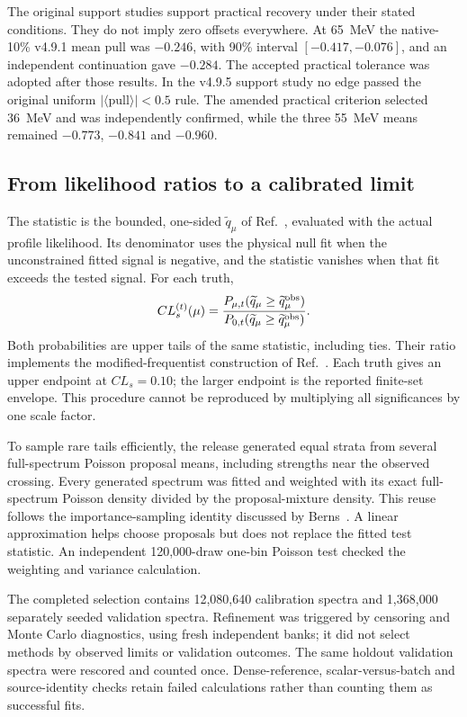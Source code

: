 The original support studies support practical recovery under their stated
conditions. They do not imply zero offsets everywhere. At 65~MeV the
native-10\% v4.9.1 mean pull was $-0.246$, with 90\% interval
$[-0.417,-0.076]$, and an independent continuation gave $-0.284$.
The accepted practical tolerance was adopted after those results. In the
v4.9.5 support study no edge passed the original uniform
$|\langle\mathrm{pull}\rangle|<0.5$ rule. The amended practical criterion
selected 36~MeV and was independently confirmed, while the three
55~MeV means remained $-0.773$, $-0.841$ and $-0.960$.

\subsection{From likelihood ratios to a calibrated limit}
The statistic is the bounded, one-sided $\widetilde q_\mu$ of
Ref.~\cite{Cowan2011}, evaluated with the actual profile likelihood.
Its denominator uses the physical null fit when the unconstrained fitted
signal is negative, and the statistic vanishes when that fit exceeds the
tested signal. For each truth,
\begin{equation}
 CL_s^{(t)}(\mu)=
 \frac{P_{\mu,t}(\widetilde q_\mu\geq\widetilde q_\mu^{\rm obs})}
      {P_{0,t}(\widetilde q_\mu\geq\widetilde q_\mu^{\rm obs})}.
 \label{v5-eq:empirical-cls}
\end{equation}
Both probabilities are upper tails of the same statistic, including ties.
Their ratio implements the modified-frequentist construction
of Ref.~\cite{Read2002}. Each truth gives an upper endpoint at
$CL_s=0.10$; the larger endpoint is the reported finite-set envelope.
This procedure cannot be reproduced by multiplying all significances by
one scale factor.

To sample rare tails efficiently, the release generated equal strata
from several full-spectrum Poisson proposal means, including strengths
near the observed crossing. Every generated spectrum was fitted and
weighted with its exact full-spectrum Poisson density divided by the
proposal-mixture density. This reuse follows the importance-sampling
identity discussed by Berns~\cite{Berns2024}. A linear approximation
helps choose proposals but does not replace the fitted test statistic.
An independent 120,000-draw one-bin Poisson test checked the weighting
and variance calculation.

The completed selection contains 12,080,640 calibration spectra and
1,368,000 separately seeded validation spectra. Refinement was triggered
by censoring and Monte Carlo diagnostics, using fresh independent banks;
it did not select methods by observed limits or validation outcomes.
The same holdout validation spectra were rescored and counted once.
Dense-reference, scalar-versus-batch and source-identity checks retain
failed calculations rather than counting them as successful fits.

